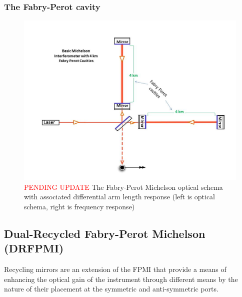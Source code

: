 \subsubsection{The Fabry-Perot cavity}


\begin{figure}[H]
\begin{center}
\includegraphics[width=\textwidth]{figs/INTRO/tempsub_Basic_michelson_with_FP_labeled.jpg}
\end{center}
\caption{\textcolor{red}{PENDING UPDATE} The Fabry-Perot Michelson optical schema with associated differential arm length response (left is optical schema, right is frequency response)}
\label{fig:fp_michelson}
\end{figure}

\subsection{Dual-Recycled Fabry-Perot Michelson (DRFPMI)}
Recycling mirrors are an extension of the FPMI that provide a means of enhancing the optical gain of the instrument through different means by the nature of their placement at the symmetric and anti-symmetric ports.

